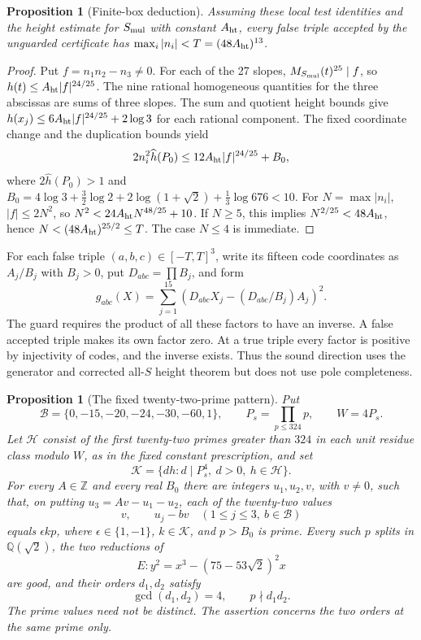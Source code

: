 \documentclass[11pt]{article}
\newtheorem{proposition}[theorem]{Proposition}
\theoremstyle{definition}
\theoremstyle{remark}
\begin{document}
\begin{proposition}[Finite-box deduction]\label{prop:box}
Assuming these local test identities and the height estimate for
$S_{\rm mul}$ with constant $A_{\rm ht}$, every false triple accepted
by the unguarded certificate has $\max_i|n_i|<T=(48A_{\rm ht})^{13}$.
\end{proposition}
\begin{proof}
Put $f=n_1n_2-n_3\ne0$. For each of the 27 slopes,
$M_{S_{\rm mul}}(t)^{25}\mid f$, so $h(t)\le A_{\rm ht}|f|^{24/25}$.
The nine rational homogeneous quantities for the three abscissas
are sums of three slopes. The sum and quotient height bounds give
$h(x_j)\le6A_{\rm ht}|f|^{24/25}+2\log3$ for each rational component.
The fixed coordinate change and the duplication bounds yield
\[
 2n_i^2\widehat h(P_0)\le12A_{\rm ht}|f|^{24/25}+B_0,
\]
where $2\widehat h(P_0)>1$ and
$B_0=4\log3+\tfrac32\log2+2\log(1+\sqrt2)+\tfrac13\log676<10$.
For $N=\max|n_i|$, $|f|\le2N^2$, so
$N^2<24A_{\rm ht}N^{48/25}+10$.
If $N\ge5$, this implies $N^{2/25}<48A_{\rm ht}$, hence
$N<(48A_{\rm ht})^{25/2}\le T$. The case $N\le4$ is immediate.
\end{proof}

For each false triple $(a,b,c)\in[-T,T]^3$, write its fifteen code
coordinates as $A_j/B_j$ with $B_j>0$, put $D_{abc}=\prod B_j$, and
form
\[
 g_{abc}(X)=\sum_{j=1}^{15}
       (D_{abc}X_j-(D_{abc}/B_j)A_j)^2.
\]
The guard requires the product of all these factors to have an inverse.
A false accepted triple makes its own factor zero. At a true triple
every factor is positive by injectivity of codes, and the inverse exists.
Thus the sound direction uses the generator and corrected all-$S$
height theorem but does not use pole completeness.


\begin{proposition}[The fixed twenty-two-prime pattern]\label{prop:fixed-prime-pattern}
Put
\[
 \mathcal B=\{0,-15,-20,-24,-30,-60,1\},\qquad
 P_s=\prod_{p\le324}p,\qquad W=4P_s.
\]
Let $\mathcal H$ consist of the first twenty-two primes greater than
$324$ in each unit residue class modulo $W$, as in the fixed constant
prescription, and set
\[
 \mathcal K=\{dh:d\mid P_s^4,\ d>0,\ h\in\mathcal H\}.
\]
For every $A\in\mathbb Z$ and every real $B_0$ there are integers
$u_1,u_2,v$, with $v\ne0$, such that, on putting $u_3=Av-u_1-u_2$,
each of the twenty-two values
\[
 v,\qquad u_j-bv\quad(1\le j\le3,\ b\in\mathcal B)
\]
equals $\epsilon k p$, where $\epsilon\in\{1,-1\}$,
$k\in\mathcal K$, and $p>B_0$ is prime. Every such $p$ splits in
$\mathbb Q(\sqrt2)$, the two reductions of
\[
 E:y^2=x^3-(75-53\sqrt2)^2x
\]
are good, and their orders $d_1,d_2$ satisfy
\[
 \gcd(d_1,d_2)=4,\qquad p\nmid d_1d_2.
\]
The prime values need not be distinct. The assertion concerns the two
orders at the same prime only.
\end{proposition}
\end{document}
